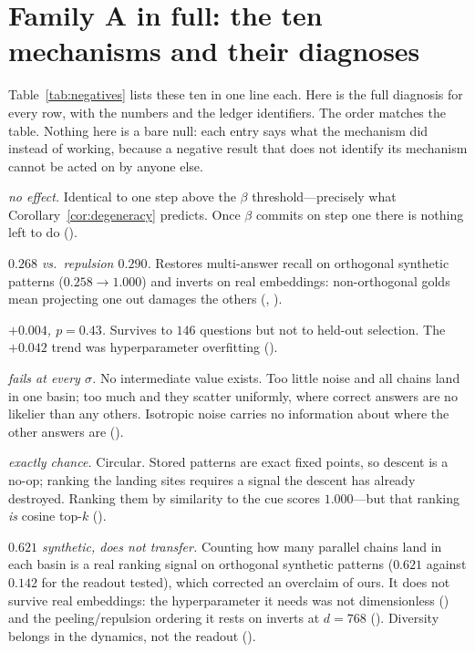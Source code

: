 \section{Family A in full: the ten mechanisms and their diagnoses}
\label{app:familya}

Table~\ref{tab:negatives} lists these ten in one line each. Here is the full diagnosis for
every row, with the numbers and the ledger identifiers. The order matches the table. Nothing
here is a bare null: each entry says what the mechanism did instead of working, because a
negative result that does not identify its mechanism cannot be acted on by anyone else.

\begin{description}\itemsep4pt
\item[\textnormal{\textbf{Multi-step descent (G1).}}] \emph{no effect.} Identical to one step above the $\beta$ threshold---precisely what Corollary~\ref{cor:degeneracy} predicts. Once $\beta$ commits on step one there is nothing left to do ().
\item[\textnormal{\textbf{Residual peeling.}}] \emph{$0.268$ vs.\ repulsion $0.290$.} Restores multi-answer recall on orthogonal synthetic patterns ($0.258 \to 1.000$) and inverts on real embeddings: non-orthogonal golds mean projecting one out damages the others (, ).
\item[\textnormal{\textbf{Repulsive parallel descent.}}] \emph{$+0.004$, $p{=}0.43$.} Survives to $146$ questions but not to held-out selection. The $+0.042$ trend was hyperparameter overfitting ().
\item[\textnormal{\textbf{Noise-seeded parallel descent.}}] \emph{fails at every $\sigma$.} No intermediate value exists. Too little noise and all chains land in one basin; too much and they scatter uniformly, where correct answers are no likelier than any others. Isotropic noise carries no information about where the other answers are ().
\item[\textnormal{\textbf{Cosine-seeded parallel descent.}}] \emph{exactly chance.} Circular. Stored patterns are exact fixed points, so descent is a no-op; ranking the landing sites requires a signal the descent has already destroyed. Ranking them by similarity to the cue scores $1.000$---but that ranking \emph{is} cosine top-$k$ ().
\item[\textnormal{\textbf{Vote-count readout.}}] \emph{$0.621$ synthetic, does not transfer.} Counting how many parallel chains land in each basin is a real ranking signal on orthogonal synthetic patterns ($0.621$ against $0.142$ for the readout  tested), which corrected an overclaim of ours. It does not survive real embeddings: the hyperparameter it needs was not dimensionless () and the peeling/repulsion ordering it rests on inverts at $d{=}768$ (). Diversity belongs in the dynamics, not the readout ().

\end{description}
